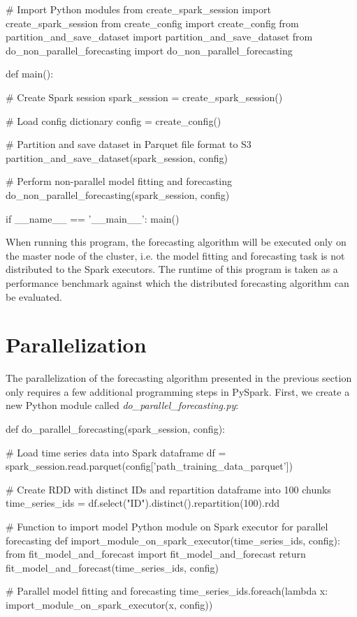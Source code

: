 \documentclass[11pt]{article}
\begin{document}
\begin{python}[caption={\emph{main.py}}]
# Import Python modules
from create_spark_session import create_spark_session
from create_config import create_config
from partition_and_save_dataset import partition_and_save_dataset
from do_non_parallel_forecasting import do_non_parallel_forecasting

def main():

    # Create Spark session
    spark_session = create_spark_session()

    # Load config dictionary
    config = create_config()

    # Partition and save dataset in Parquet file format to S3
    partition_and_save_dataset(spark_session, config)

    # Perform non-parallel model fitting and forecasting
    do_non_parallel_forecasting(spark_session, config)

if __name__ == '__main__':
    main()
\end{python}  

When running this program, the forecasting algorithm will be executed only on the master node of the cluster, i.e. the model fitting and forecasting task is not distributed to the Spark executors. The runtime of this program is taken as a performance benchmark against which the distributed forecasting algorithm can be evaluated.  

\section{Parallelization}
\label{sec:parallelization}

The parallelization of the forecasting algorithm presented in the previous section only requires a few additional programming steps in PySpark. First, we create a new Python module called \emph{do\_parallel\_forecasting.py}:

\begin{python}[caption={\emph{do\_parallel\_forecasting.py}}]
def do_parallel_forecasting(spark_session, config):

    # Load time series data into Spark dataframe
    df = spark_session.read.parquet(config['path_training_data_parquet'])

    # Create RDD with distinct IDs and repartition dataframe into 100 chunks
    time_series_ids = df.select("ID").distinct().repartition(100).rdd

    # Function to import model Python module on Spark executor for parallel forecasting
    def import_module_on_spark_executor(time_series_ids, config):
        from fit_model_and_forecast import fit_model_and_forecast
        return fit_model_and_forecast(time_series_ids, config)

    # Parallel model fitting and forecasting
    time_series_ids.foreach(lambda x: import_module_on_spark_executor(x, config))
\end{python}
\end{document}
